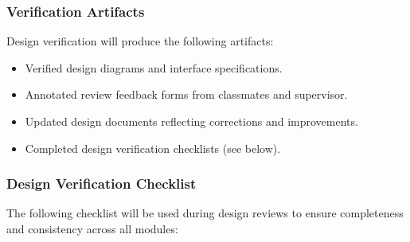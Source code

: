 \documentclass[12pt, titlepage]{article}
\begin{document}
\subsubsection*{Verification Artifacts}
Design verification will produce the following artifacts:
\begin{itemize}
    \item Verified design diagrams and interface specifications.
    \item Annotated review feedback forms from classmates and supervisor.
    \item Updated design documents reflecting corrections and improvements.
    \item Completed design verification checklists (see below).
\end{itemize}

\subsubsection*{Design Verification Checklist}
The following checklist will be used during design reviews to ensure 
completeness and consistency across all modules:

\newpage 
\end{document}
